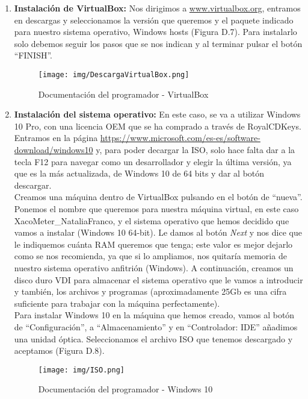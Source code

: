 \begin{enumerate}
    \item \textbf{Instalación de VirtualBox:}
    Nos dirigimos a \url{www.virtualbox.org}, entramos en descargas y seleccionamos la versión
    que queremos y el paquete indicado para nuestro sistema operativo, Windows hosts (Figura D.7).
    Para instalarlo solo debemos seguir los pasos que se nos indican y al terminar pulsar el
    botón “FINISH”.
    \begin{figure}[h!]
        \centering
        \texttt{[image: img/DescargaVirtualBox.png]} \\
        \caption{Documentación del programador - VirtualBox}
        \label{Documentación del programador - VirtualBox}
    \end{figure}
    \item \textbf{Instalación del sistema operativo:}
    En este caso, se va a utilizar Windows 10 Pro, con una licencia OEM que se ha comprado a través de RoyalCDKeys.\cite{RoyalCDKeys}\\
    Entramos en la página \url{https://www.microsoft.com/es-es/software-download/windows10} y, para poder decargar la ISO, solo hace falta dar a la tecla F12 para navegar como un desarrollador y elegir la última versión, ya que es la más actualizada, de Windows 10 de 64 bits y dar al botón descargar.\\
    Creamos una máquina dentro de VirtualBox pulsando en el botón de “nueva”. Ponemos el
    nombre que queremos para nuestra máquina virtual, en este caso XacoMeter\_NataliaFranco, y el sistema operativo que hemos decidido que vamos a instalar (Windows 10 64-bit). Le damos al botón \textit{Next} y nos dice que le indiquemos cuánta RAM queremos que tenga; este valor es mejor dejarlo como
    se nos recomienda, ya que si lo ampliamos, nos quitaría memoria de nuestro sistema
    operativo anfitrión (Windows). A continuación, creamos un disco duro VDI para almacenar el sistema
    operativo que le vamos a introducir y también, los archivos y programas (aproximadamente 25Gb
    es una cifra suficiente para trabajar con la máquina perfectamente).\\
    Para instalar Windows 10 en la máquina que hemos creado, vamos al botón de
    “Configuración”, a “Almacenamiento” y en “Controlador: IDE” añadimos una unidad
    óptica. Seleccionamos el archivo ISO que tenemos descargado y aceptamos (Figura D.8).
    \begin{figure}[h!]
        \centering
        \texttt{[image: img/ISO.png]} \\
        \caption{Documentación del programador - Windows 10}
        \label{Documentación del programador - Windows 10}
    \end{figure}


\end{enumerate}
